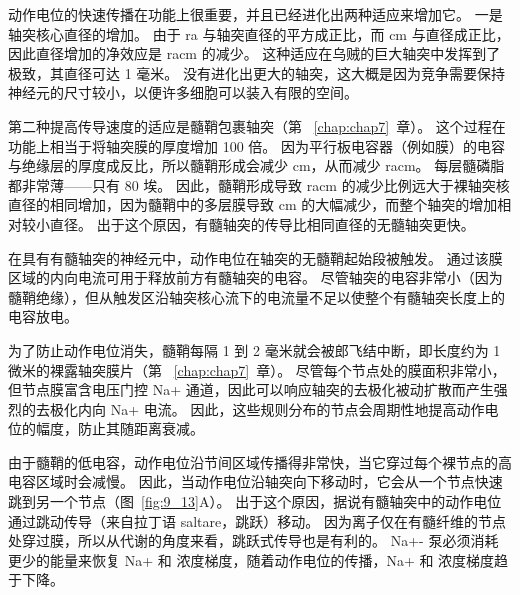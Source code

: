 动作电位的快速传播在功能上很重要，并且已经进化出两种适应来增加它。
一是轴突核心直径的增加。
由于 ra 与轴突直径的平方成正比，而 cm 与直径成正比，因此直径增加的净效应是 racm 的减少。
这种适应在乌贼的巨大轴突中发挥到了极致，其直径可达 1 毫米。
没有进化出更大的轴突，这大概是因为竞争需要保持神经元的尺寸较小，以便许多细胞可以装入有限的空间。


第二种提高传导速度的适应是髓鞘包裹轴突（第 ~\ref{chap:chap7}~章）。 
这个过程在功能上相当于将轴突膜的厚度增加 100 倍。 
因为平行板电容器（例如膜）的电容与绝缘层的厚度成反比，所以髓鞘形成会减少 cm，从而减少 racm。
每层髓磷脂都非常薄——只有 80 埃。
因此，髓鞘形成导致 racm 的减少比例远大于裸轴突核直径的相同增加，因为髓鞘中的多层膜导致 cm 的大幅减少，而整个轴突的增加相对较小直径。
出于这个原因，有髓轴突的传导比相同直径的无髓轴突更快。


在具有有髓轴突的神经元中，动作电位在轴突的无髓鞘起始段被触发。
通过该膜区域的内向电流可用于释放前方有髓轴突的电容。
尽管轴突的电容非常小（因为髓鞘绝缘），但从触发区沿轴突核心流下的电流量不足以使整个有髓轴突长度上的电容放电。


为了防止动作电位消失，髓鞘每隔 1 到 2 毫米就会被郎飞结中断，即长度约为 1 微米的裸露轴突膜片（第 ~\ref{chap:chap7}~章）。 
尽管每个节点处的膜面积非常小，但节点膜富含电压门控 Na+ 通道，因此可以响应轴突的去极化被动扩散而产生强烈的去极化内向 Na+ 电流。
因此，这些规则分布的节点会周期性地提高动作电位的幅度，防止其随距离衰减。


由于髓鞘的低电容，动作电位沿节间区域传播得非常快，当它穿过每个裸节点的高电容区域时会减慢。
因此，当动作电位沿轴突向下移动时，它会从一个节点快速跳到另一个节点（图~\ref{fig:9_13}A）。 
出于这个原因，据说有髓轴突中的动作电位通过跳动传导（来自拉丁语 saltare，跳跃）移动。
因为离子仅在有髓纤维的节点处穿过膜，所以从代谢的角度来看，跳跃式传导也是有利的。
Na+- 泵必须消耗更少的能量来恢复 Na+ 和  浓度梯度，随着动作电位的传播，Na+ 和  浓度梯度趋于下降。


